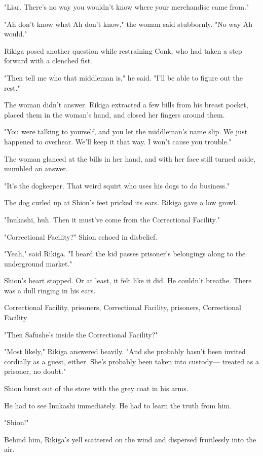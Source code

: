 "Liar. There's no way you wouldn't know where your merchandise came
from."

"Ah don't know what Ah don't know," the woman said stubbornly. "No way
Ah would."

Rikiga posed another question while restraining Conk, who had taken a
step forward with a clenched fist.

"Then tell me who that middleman is," he said. "I'll be able to figure
out the rest."

The woman didn't answer. Rikiga extracted a few bills from his breast
pocket, placed them in the woman's hand, and closed her fingers around
them.

"You were talking to yourself, and you let the middleman's name slip. We
just happened to overhear. We'll keep it that way. I won't cause you
trouble."

The woman glanced at the bills in her hand, and with her face still
turned aside, mumbled an answer.

"It's the dogkeeper. That weird squirt who uses his dogs to do
business."

The dog curled up at Shion's feet pricked its ears. Rikiga gave a low
growl.

"Inukashi, huh. Then it must've come from the Correctional Facility."

"Correctional Facility?" Shion echoed in disbelief.

"Yeah," said Rikiga. "I heard the kid passes prisoner's belongings along
to the underground market."

Shion's heart stopped. Or at least, it felt like it did. He couldn't
breathe. There was a dull ringing in his ears.

Correctional Facility, prisoners, Correctional Facility, prisoners,
Correctional Facility\el 

"Then Safu\el she's inside the Correctional Facility?"

"Most likely," Rikiga answered heavily. "And she probably hasn't been
invited cordially as a guest, either. She's probably been taken into
custody--- treated as a prisoner, no doubt."

Shion burst out of the store with the grey coat in his arms.

He had to see Inukashi immediately. He had to learn the truth from him.

"Shion!"

Behind him, Rikiga's yell scattered on the wind and dispersed
fruitlessly into the air.

